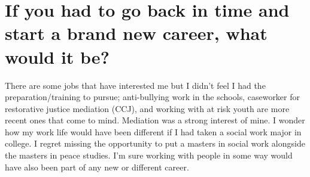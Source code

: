 \section{If you had to go back in time and start a brand new career, what would it be?}
There are some jobs that have interested me but I didn't feel I had the preparation/training to pursue; anti-bullying work in the schools, caseworker for restorative justice mediation (CCJ), and working with at risk youth are more recent ones that come to mind.
Mediation was a strong interest of mine.
I wonder how my work life would have been different if I had taken a social work major in college.
I regret missing the opportunity to put a masters in social work alongside the masters in peace studies.
I'm sure working with people in some way would have also been part of any new or different career.





